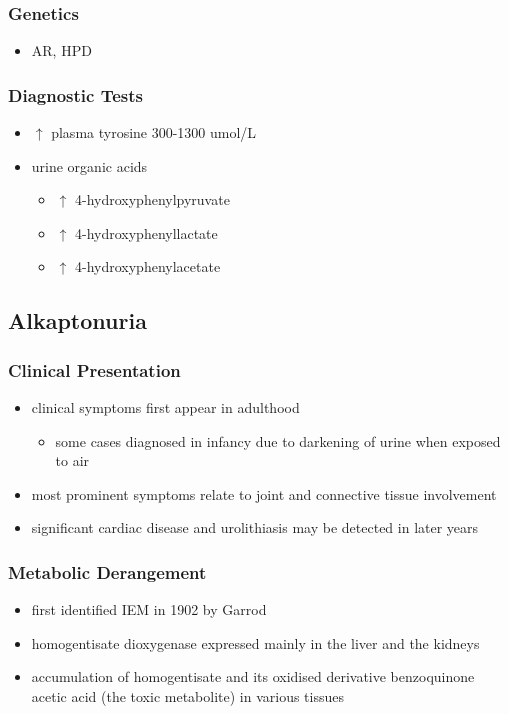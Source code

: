 \documentclass{scrartcl}
\begin{document}
\subsubsection{Genetics}
\label{sec:orgd907256}
\begin{itemize}
\item AR, HPD
\end{itemize}
\subsubsection{Diagnostic Tests}
\label{sec:orgcf498fb}
\begin{itemize}
\item \(\uparrow\) plasma tyrosine 300-1300 umol/L
\item urine organic acids
\begin{itemize}
\item \(\uparrow\) 4-hydroxyphenylpyruvate
\item \(\uparrow\) 4-hydroxyphenyllactate
\item \(\uparrow\) 4-hydroxyphenylacetate
\end{itemize}
\end{itemize}

\subsection{Alkaptonuria}
\label{sec:org8d007f0}
\subsubsection{Clinical Presentation}
\label{sec:orgcc3902b}
\begin{itemize}
\item clinical symptoms first appear in adulthood
\begin{itemize}
\item some cases diagnosed in infancy due to darkening of urine when
exposed to air
\end{itemize}
\item most prominent symptoms relate to joint and connective tissue involvement
\item significant cardiac disease and urolithiasis may be detected in later years
\end{itemize}
\subsubsection{Metabolic Derangement}
\label{sec:orgc483347}
\begin{itemize}
\item first identified IEM in 1902 by Garrod
\item homogentisate dioxygenase expressed mainly in the liver and the
kidneys
\end{itemize}
\begin{itemize}
\item accumulation of homogentisate and its oxidised derivative
benzoquinone acetic acid (the toxic metabolite) in various tissues
\end{itemize}
\end{document}
